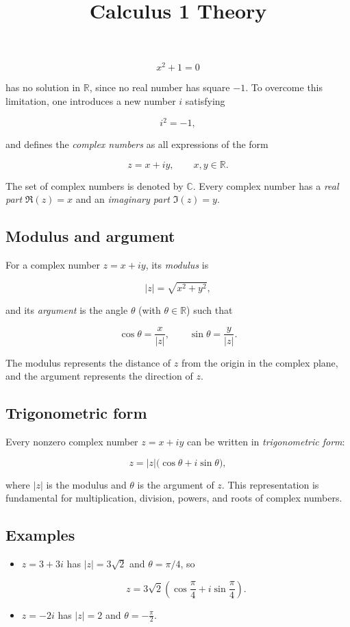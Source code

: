 \documentclass[11pt,a4paper]{article} \usepackage[T1]{fontenc}
\theoremstyle{plain} \newtheorem{theorem}{Theorem} \title{Calculus 1 Theory}
\begin{document}
\[
x^2 + 1 = 0
\]

has no solution in $\mathbb{R}$, since no real number has square $-1$. To
overcome this limitation, one introduces a new number $i$ satisfying

\[
i^2 = -1,
\]

and defines the \emph{complex numbers} as all expressions of the form

\[
z = x + iy, \qquad x,y\in\mathbb{R}.
\]

The set of complex numbers is denoted by $\mathbb{C}$. Every complex number has
a \emph{real part} $\Re(z)=x$ and an \emph{imaginary part} $\Im(z)=y$.

\subsection*{Modulus and argument}

For a complex number $z=x+iy$, its \emph{modulus} is

\[
|z| = \sqrt{x^2 + y^2},
\]

and its \emph{argument} is the angle $\theta$ (with $\theta\in\mathbb{R}$) such
that

\[
\cos\theta = \frac{x}{|z|}, \qquad \sin\theta = \frac{y}{|z|}.
\]

The modulus represents the distance of $z$ from the origin in the complex
plane, and the argument represents the direction of $z$.

\subsection*{Trigonometric form}

Every nonzero complex number $z=x+iy$ can be written in \emph{trigonometric
form}:

\[
z = |z|\bigl(\cos\theta + i\sin\theta\bigr),
\]

where $|z|$ is the modulus and $\theta$ is the argument of $z$. This
representation is fundamental for multiplication, division, powers, and roots
of complex numbers.

\subsection*{Examples}

\begin{itemize}
\item $z = 3 + 3i$ has $|z| = 3\sqrt{2}$ and $\theta = \pi/4$, so

\[
z = 3\sqrt{2}\left(\cos\frac{\pi}{4} + i\sin\frac{\pi}{4}\right).
\]

\item $z = -2i$ has $|z| = 2$ and $\theta = -\frac{\pi}{2}$.
\end{itemize}
\end{document}

